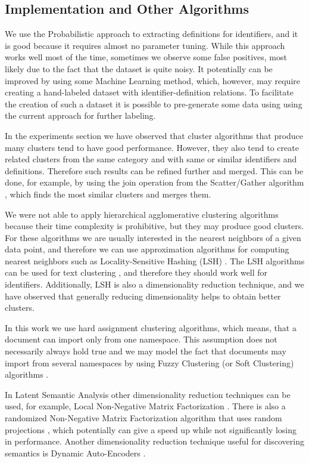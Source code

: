 \subsection{Implementation and Other Algorithms}  %

We use the Probabilistic approach to extracting definitions for identifiers, and
it is good because it requires almost no parameter tuning.
While this approach works well most of the time, sometimes we observe
some false positives, most likely due to the fact that the dataset is
quite noisy. It potentially can be improved by using some Machine Learning
method, which, however, may require creating a hand-labeled dataset
with identifier-definition relations. To facilitate the creation of such a
dataset it is possible to pre-generate some data using using the current approach
for further labeling.

In the experiments section we have observed that cluster algorithms that produce
many clusters tend to have good performance. However, they also tend to create related
clusters from the same category and with same or similar identifiers and
definitions. Therefore such results can be refined further and merged.
This can be done, for example, by using the join operation from
the Scatter/Gather algorithm \cite{cutting1992scatter}, which finds the most
similar clusters and merges them.

We were not able to apply hierarchical agglomerative clustering algorithms because
their time complexity is prohibitive, but they may produce good clusters.
For these algorithms we are usually interested in the nearest neighbors of a given
data point, and therefore we can use approximation algorithms for computing nearest
neighbors such as Locality-Sensitive Hashing (LSH) \cite{leskovec2014mining}.
The LSH algorithms can be used for text clustering \cite{ravichandran2005randomized},
and therefore they should work well for identifiers. Additionally, LSH is also a
dimensionality reduction technique, and we have observed that generally
reducing dimensionality helps to obtain better clusters.

In this work we use hard assignment clustering algorithms, which means, that a document
can import only from one namespace. This assumption does not necessarily always hold true
and we may model the fact that documents may import from several namespaces by
using Fuzzy Clustering (or Soft Clustering) algorithms \cite{baraldi1999survey}.

In Latent Semantic Analysis other dimensionality reduction techniques
can be used, for example, Local Non-Negative Matrix Factorization \cite{li2001learning}.
There is also a randomized Non-Negative Matrix Factorization algorithm that uses
random projections \cite{wang2010efficient} \cite{damle2014random},
which potentially can give a speed up while not significantly losing
in performance. Another dimensionality reduction technique useful for
discovering semantics is Dynamic Auto-Encoders \cite{mirowski2010dynamic}.

